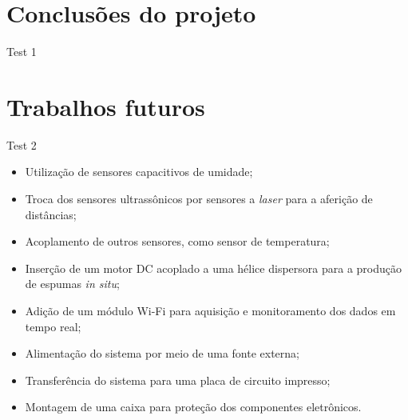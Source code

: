 \section{Conclusões do projeto}

Test 1


\section{Trabalhos futuros}

Test 2

\begin{itemize}
    \item Utilização de sensores capacitivos de umidade;
    \item Troca dos sensores ultrassônicos por sensores a \textit{laser} para a aferição de distâncias;
    \item Acoplamento de outros sensores, como sensor de temperatura;
    \item Inserção de um motor   DC acoplado a uma hélice dispersora para a produção de espumas \textit{in situ};
    \item Adição de um módulo Wi-Fi para aquisição e monitoramento dos dados em tempo real;
    \item Alimentação do sistema por meio de uma fonte externa;
    \item Transferência do sistema para uma placa de circuito impresso;
    \item Montagem de uma caixa para proteção dos componentes eletrônicos.
\end{itemize}